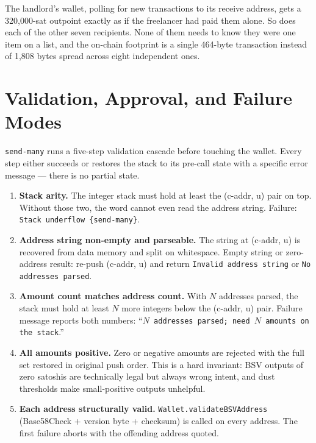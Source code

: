 \documentclass[a4paper, 11pt]{article}
\begin{document}
The landlord's wallet, polling for new transactions to its receive address, gets a 320{,}000-sat outpoint exactly as if the freelancer had paid them alone. So does each of the other seven recipients. None of them needs to know they were one item on a list, and the on-chain footprint is a single 464-byte transaction instead of 1{,}808 bytes spread across eight independent ones.

\section{Validation, Approval, and Failure Modes}

\texttt{send-many} runs a five-step validation cascade before touching the wallet. Every step either succeeds or restores the stack to its pre-call state with a specific error message --- there is no partial state.

\begin{enumerate}
\item \textbf{Stack arity.} The integer stack must hold at least the (c-addr, u) pair on top. Without those two, the word cannot even read the address string. Failure: \texttt{Stack underflow \{send-many\}}.
\item \textbf{Address string non-empty and parseable.} The string at (c-addr, u) is recovered from data memory and split on whitespace. Empty string or zero-address result: re-push (c-addr, u) and return \texttt{Invalid address string} or \texttt{No addresses parsed}.
\item \textbf{Amount count matches address count.} With $N$ addresses parsed, the stack must hold at least $N$ more integers below the (c-addr, u) pair. Failure message reports both numbers: ``\texttt{$N$ addresses parsed; need $N$ amounts on the stack}.''
\item \textbf{All amounts positive.} Zero or negative amounts are rejected with the full set restored in original push order. This is a hard invariant: BSV outputs of zero satoshis are technically legal but always wrong intent, and dust thresholds make small-positive outputs unhelpful.
\item \textbf{Each address structurally valid.} \texttt{Wallet.validateBSVAddress} (Base58Check + version byte + checksum) is called on every address. The first failure aborts with the offending address quoted.
\end{enumerate}
\end{document}
